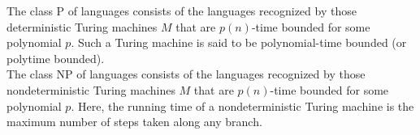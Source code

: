	\begin{fdef}
		The class \textsf{P} of languages consists of the languages recognized by those deterministic Turing machines $M$ that are $p(n)$-time bounded for some polynomial $p$. Such a Turing machine is said to be polynomial-time bounded (or polytime bounded).\\
		The class \textsf{NP} of languages consists of the languages recognized by those nondeterministic Turing machines $M$ that are $p(n)$-time bounded for some polynomial $p$. Here, the running time of a nondeterministic Turing machine is the maximum number of steps taken along any branch. \\
	\end{fdef}
